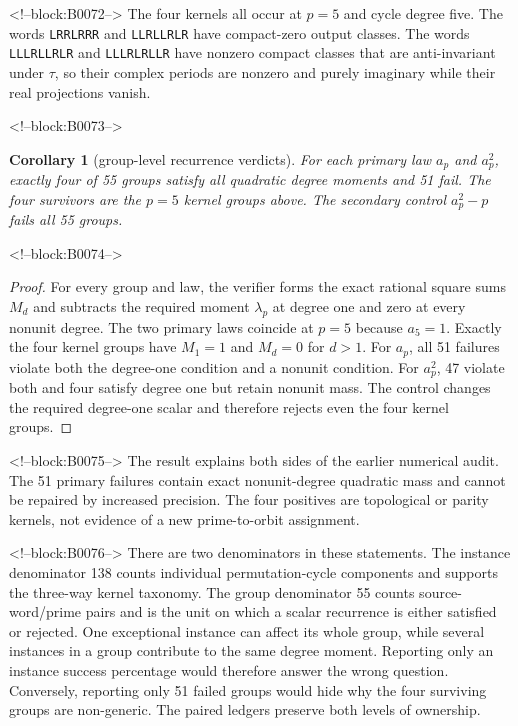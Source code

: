 \documentclass[11pt]{article}
\newtheorem{corollary}[theorem]{Corollary}
\theoremstyle{definition}
\theoremstyle{remark}
\begin{document}
<!--block:B0072-->
The four kernels all occur at $p=5$ and cycle degree five. The words \texttt{LRRLRRR} and \texttt{LLRLLRLR} have compact-zero output classes. The words \texttt{LLLRLLRLR} and \texttt{LLLRLRLLR} have nonzero compact classes that are anti-invariant under $\tau$, so their complex periods are nonzero and purely imaginary while their real projections vanish.

<!--block:B0073-->
\begin{corollary}[group-level recurrence verdicts]\label{cor:groups}
For each primary law $a_p$ and $a_p^2$, exactly four of 55 groups satisfy all quadratic degree moments and 51 fail. The four survivors are the $p=5$ kernel groups above. The secondary control $a_p^2-p$ fails all 55 groups.
\end{corollary}

<!--block:B0074-->
\begin{proof}
For every group and law, the verifier forms the exact rational square sums $M_d$ and subtracts the required moment $\lambda_p$ at degree one and zero at every nonunit degree. The two primary laws coincide at $p=5$ because $a_5=1$. Exactly the four kernel groups have $M_1=1$ and $M_d=0$ for $d>1$. For $a_p$, all 51 failures violate both the degree-one condition and a nonunit condition. For $a_p^2$, 47 violate both and four satisfy degree one but retain nonunit mass. The control changes the required degree-one scalar and therefore rejects even the four kernel groups.
\end{proof}

<!--block:B0075-->
The result explains both sides of the earlier numerical audit. The 51 primary failures contain exact nonunit-degree quadratic mass and cannot be repaired by increased precision. The four positives are topological or parity kernels, not evidence of a new prime-to-orbit assignment.

<!--block:B0076-->
There are two denominators in these statements. The instance denominator 138 counts individual permutation-cycle components and supports the three-way kernel taxonomy. The group denominator 55 counts source-word/prime pairs and is the unit on which a scalar recurrence is either satisfied or rejected. One exceptional instance can affect its whole group, while several instances in a group contribute to the same degree moment. Reporting only an instance success percentage would therefore answer the wrong question. Conversely, reporting only 51 failed groups would hide why the four surviving groups are non-generic. The paired ledgers preserve both levels of ownership.
\end{document}
